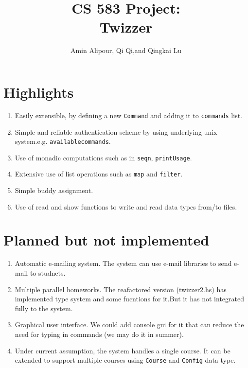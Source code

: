 \documentclass{article}
\title{CS 583 Project:\\Twizzer}
\date{}
\author{Amin Alipour, Qi Qi,and Qingkai Lu}
\begin{document}
\maketitle


\section{Highlights}
\begin{enumerate}
\item Easily extensible, by defining a new  \texttt{Command} and  adding it to  \texttt{commands} list.
\item Simple and reliable  authentication  scheme by using underlying unix system.e.g. \texttt{availablecommands}.
\item Use of monadic computations such as in \texttt{seqn}, \texttt{printUsage}.
\item Extensive use of list operations such as \texttt{map} and \texttt{filter}. 
\item Simple buddy assignment.
\item Use of read and show functions to write  and read  data types from/to files.
\end{enumerate}


\section{Planned but not implemented}
\begin{enumerate}
\item Automatic e-mailing system. The system can use e-mail libraries to send e-mail to studnets.
\item Multiple parallel homeworks. The reafactored version (twizzer2.hs) has implemented type system and some fucntions for it.But it has not integrated fully to the system.
\item Graphical user interface. We could add console gui for it that can reduce the need for typing in commands (we may do it in summer).
\item Under current assumption, the system handles a single course. It can be extended to support multiple courses using \texttt{Course} and \texttt{Config} data type.
\end{enumerate}
\end{document}
